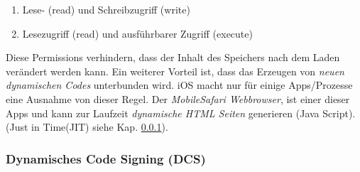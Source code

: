 \begin{enumerate}
    \item Lese- (read) und Schreibzugriff (write)
    \item Lesezugriff (read) und ausführbarer Zugriff (execute)
\end{enumerate}
Diese Permissions verhindern, dass der Inhalt des Speichers nach dem Laden verändert werden kann. Ein weiterer Vorteil ist, dass das Erzeugen von \textit{\glqq neuen dynamischen Codes\grqq{}} unterbunden wird. iOS macht  nur für einige Apps/Prozesse eine Ausnahme von dieser Regel. Der \textit{\glqq MobileSafari Webbrowser\grqq}, ist einer dieser Apps und kann zur Laufzeit \textit{\glqq dynamische HTML Seiten\grqq{}} generieren (Java Script). (Just in Time(JIT) siehe Kap. \ref{sec:Jit}).



\subsubsection{Dynamisches Code Signing (DCS)}
\label{sec:Jit}

